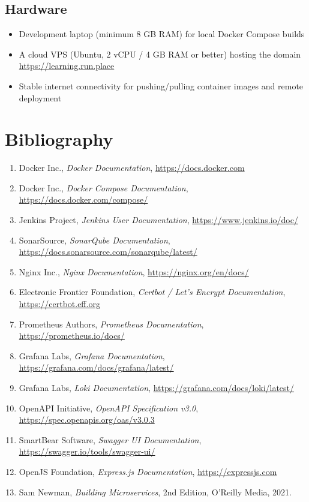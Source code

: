 \documentclass[12pt,a4paper]{article}
\begin{document}
\subsection{Hardware}
\begin{itemize}[itemsep=1pt, topsep=2pt]
  \item Development laptop (minimum 8 GB RAM) for local Docker Compose builds
  \item A cloud VPS (Ubuntu, 2 vCPU / 4 GB RAM or better) hosting the domain
        \url{https://learning.run.place}
  \item Stable internet connectivity for pushing/pulling container images and
        remote deployment
\end{itemize}

\clearpage
\section*{Bibliography}

\begin{enumerate}[leftmargin=1.4cm, itemsep=3pt]
  \item Docker Inc., \emph{Docker Documentation}, \url{https://docs.docker.com}
  \item Docker Inc., \emph{Docker Compose Documentation}, \url{https://docs.docker.com/compose/}
  \item Jenkins Project, \emph{Jenkins User Documentation}, \url{https://www.jenkins.io/doc/}
  \item SonarSource, \emph{SonarQube Documentation}, \url{https://docs.sonarsource.com/sonarqube/latest/}
  \item Nginx Inc., \emph{Nginx Documentation}, \url{https://nginx.org/en/docs/}
  \item Electronic Frontier Foundation, \emph{Certbot / Let's Encrypt Documentation}, \url{https://certbot.eff.org}
  \item Prometheus Authors, \emph{Prometheus Documentation}, \url{https://prometheus.io/docs/}
  \item Grafana Labs, \emph{Grafana Documentation}, \url{https://grafana.com/docs/grafana/latest/}
  \item Grafana Labs, \emph{Loki Documentation}, \url{https://grafana.com/docs/loki/latest/}
  \item OpenAPI Initiative, \emph{OpenAPI Specification v3.0}, \url{https://spec.openapis.org/oas/v3.0.3}
  \item SmartBear Software, \emph{Swagger UI Documentation}, \url{https://swagger.io/tools/swagger-ui/}
  \item OpenJS Foundation, \emph{Express.js Documentation}, \url{https://expressjs.com}
  \item Sam Newman, \emph{Building Microservices}, 2nd Edition, O'Reilly Media, 2021.

\end{enumerate}
\end{document}
